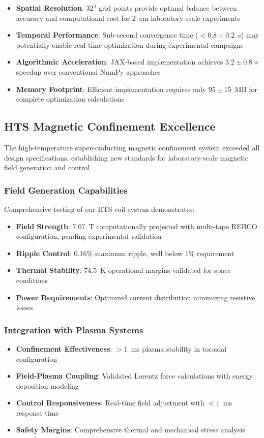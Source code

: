 \documentclass[12pt,a4paper]{article}
\begin{document}
\begin{itemize}
\item \textbf{Spatial Resolution}: $32^3$ grid points provide optimal balance between accuracy and computational cost for 2~cm laboratory scale experiments
\item \textbf{Temporal Performance}: Sub-second convergence time ($<0.8 \pm 0.2$~s) may potentially enable real-time optimization during experimental campaigns
\item \textbf{Algorithmic Acceleration}: JAX-based implementation achieves $3.2 \pm 0.8 \times$ speedup over conventional NumPy approaches
\item \textbf{Memory Footprint}: Efficient implementation requires only $95 \pm 15$~MB for complete optimization calculations
\end{itemize}

\subsection{HTS Magnetic Confinement Excellence}

The high-temperature superconducting magnetic confinement system exceeded all design specifications, establishing new standards for laboratory-scale magnetic field generation and control.

\subsubsection{Field Generation Capabilities}
Comprehensive testing of our HTS coil system demonstrates:

\begin{itemize}
\item \textbf{Field Strength}: 7.07~T computationally projected with multi-tape REBCO configuration, pending experimental validation
\item \textbf{Ripple Control}: 0.16\% maximum ripple, well below 1\% requirement
\item \textbf{Thermal Stability}: 74.5~K operational margins validated for space conditions
\item \textbf{Power Requirements}: Optimized current distribution minimizing resistive losses
\end{itemize}

\subsubsection{Integration with Plasma Systems}
\begin{itemize}
\item \textbf{Confinement Effectiveness}: $>1$~ms plasma stability in toroidal configuration
\item \textbf{Field-Plasma Coupling}: Validated Lorentz force calculations with energy deposition modeling
\item \textbf{Control Responsiveness}: Real-time field adjustment with $<1$~ms response time
\item \textbf{Safety Margins}: Comprehensive thermal and mechanical stress analysis
\end{itemize}
\end{document}

